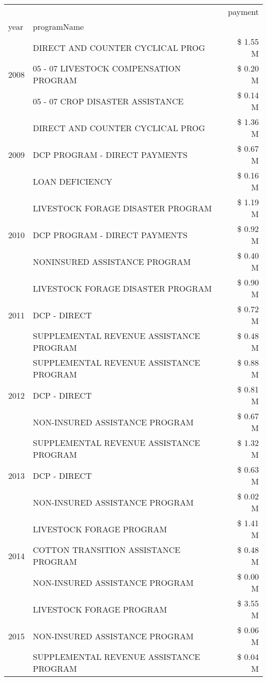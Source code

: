 \begin{tabular}{llr}
\toprule
 &  & payment \\
year & programName &  \\
\midrule
\multirow[t]{3}{*}{2008} & DIRECT AND COUNTER CYCLICAL PROG & \$ 1.55 M \\
 & 05 - 07 LIVESTOCK COMPENSATION PROGRAM & \$ 0.20 M \\
 & 05 - 07 CROP DISASTER ASSISTANCE & \$ 0.14 M \\
\cline{1-3}
\multirow[t]{3}{*}{2009} & DIRECT AND COUNTER CYCLICAL PROG & \$ 1.36 M \\
 & DCP PROGRAM - DIRECT PAYMENTS & \$ 0.67 M \\
 & LOAN DEFICIENCY & \$ 0.16 M \\
\cline{1-3}
\multirow[t]{3}{*}{2010} & LIVESTOCK FORAGE DISASTER  PROGRAM & \$ 1.19 M \\
 & DCP PROGRAM - DIRECT PAYMENTS & \$ 0.92 M \\
 & NONINSURED ASSISTANCE PROGRAM & \$ 0.40 M \\
\cline{1-3}
\multirow[t]{3}{*}{2011} & LIVESTOCK FORAGE DISASTER PROGRAM & \$ 0.90 M \\
 & DCP - DIRECT & \$ 0.72 M \\
 & SUPPLEMENTAL REVENUE ASSISTANCE PROGRAM & \$ 0.48 M \\
\cline{1-3}
\multirow[t]{3}{*}{2012} & SUPPLEMENTAL REVENUE ASSISTANCE PROGRAM & \$ 0.88 M \\
 & DCP - DIRECT & \$ 0.81 M \\
 & NON-INSURED ASSISTANCE PROGRAM & \$ 0.67 M \\
\cline{1-3}
\multirow[t]{3}{*}{2013} & SUPPLEMENTAL REVENUE ASSISTANCE PROGRAM & \$ 1.32 M \\
 & DCP - DIRECT & \$ 0.63 M \\
 & NON-INSURED ASSISTANCE PROGRAM & \$ 0.02 M \\
\cline{1-3}
\multirow[t]{3}{*}{2014} & LIVESTOCK FORAGE PROGRAM & \$ 1.41 M \\
 & COTTON TRANSITION ASSISTANCE PROGRAM & \$ 0.48 M \\
 & NON-INSURED ASSISTANCE PROGRAM & \$ 0.00 M \\
\cline{1-3}
\multirow[t]{3}{*}{2015} & LIVESTOCK FORAGE PROGRAM & \$ 3.55 M \\
 & NON-INSURED ASSISTANCE PROGRAM & \$ 0.06 M \\
 & SUPPLEMENTAL REVENUE ASSISTANCE PROGRAM & \$ 0.04 M \\
\cline{1-3}

\end{tabular}
